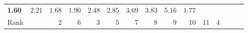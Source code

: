 \begin{tabular}{ll|rrrrrrrrr|rrrr}
  


  
  \textbf{1.60} & 2.21 & 1.68 & 1.90 & 2.48 & 2.85 & 3.69 & 3.83 & 5.16 & 1.77 &  &  \\

  Rank & &
  2 & 6 & 3 & 5 & 7 & 8 & 9 & 10 & 11 & 4 &  &  \\\hline\hline
  

\end{tabular}
